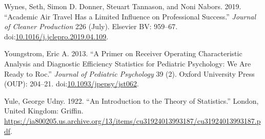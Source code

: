\documentclass[a5paper]{book}
\begin{document}
\hypertarget{ref-doi:10.1016ux2fj.jclepro.2019.04.109}{}
Wynes, Seth, Simon D. Donner, Steuart Tannason, and Noni Nabors. 2019.
``Academic Air Travel Has a Limited Influence on Professional Success.''
\emph{Journal of Cleaner Production} 226 (July). Elsevier BV: 959--67.
doi:\href{https://doi.org/10.1016/j.jclepro.2019.04.109}{10.1016/j.jclepro.2019.04.109}.

\hypertarget{ref-doi:10.1093ux2fjpepsyux2fjst062}{}
Youngstrom, Eric A. 2013. ``A Primer on Receiver Operating
Characteristic Analysis and Diagnostic Efficiency Statistics for
Pediatric Psychology: We Are Ready to Roc.'' \emph{Journal of Pediatric
Psychology} 39 (2). Oxford University Press (OUP): 204--21.
doi:\href{https://doi.org/10.1093/jpepsy/jst062}{10.1093/jpepsy/jst062}.

\hypertarget{ref-yule1922}{}
Yule, George Udny. 1922. ``An Introduction to the Theory of
Statistics.'' London, United Kingdom: Griffin.
\url{https://ia800205.us.archive.org/13/items/cu31924013993187/cu31924013993187.pdf}.
\end{document}
